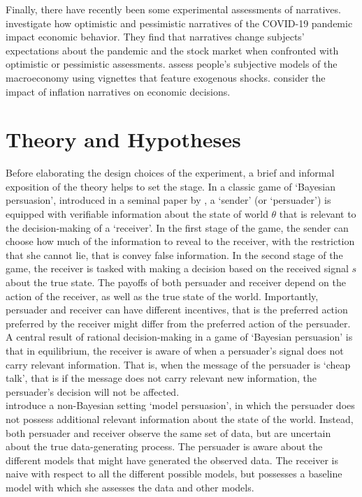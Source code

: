 \documentclass[11pt, a4paper, leqno]{article}
\begin{document}
Finally, there have recently been some experimental assessments of narratives. \citet{Harrs} investigate how optimistic and pessimistic narratives of the COVID-19 pandemic impact economic behavior. They find that narratives change subjects’ expectations about the pandemic and the stock market when confronted with optimistic or pessimistic assessments. \citet{Andre} assess people's subjective models of the macroeconomy using vignettes that feature exogenous shocks. \cite{haaland2021inflation} consider the impact of inflation narratives on economic decisions.

\section{Theory and Hypotheses}

Before elaborating the design choices of the experiment, a brief and informal exposition of the theory helps to set the stage. In a classic game of `Bayesian persuasion', introduced in a seminal paper by \cite{KG}, a `sender' (or `persuader') is equipped with verifiable information about the state of world $\theta$ that is relevant to the decision-making of a `receiver'. In the first stage of the game, the sender can choose how much of the information to reveal to the receiver, with the restriction that she cannot lie, that is convey false information. In the second stage of the game, the receiver is tasked with making a decision based on the received signal $s$ about the true state. The payoffs of both persuader and receiver depend on the action of the receiver, as well as the true state of the world. Importantly, persuader and receiver can have different incentives, that is the preferred action preferred by the receiver might differ from the preferred action of the persuader.\\

A central result of rational decision-making in a game of `Bayesian persuasion' is that in equilibrium, the receiver is aware of when a persuader's signal does not carry relevant information. That is, when the message of the persuader is `cheap talk', that is if the message does not carry relevant new information, the persuader's decision will not be affected.\\

\cite{Schwartzstein} introduce a non-Bayesian setting `model persuasion', in which the persuader does not possess additional relevant information about the state of the world. Instead, both persuader and receiver observe the same set of data, but are uncertain about the true data-generating process. The persuader is aware about the different models that might have generated the observed data. The receiver is naive with respect to all the different possible models, but possesses a baseline model with which she assesses the data and other models.
\end{document}
